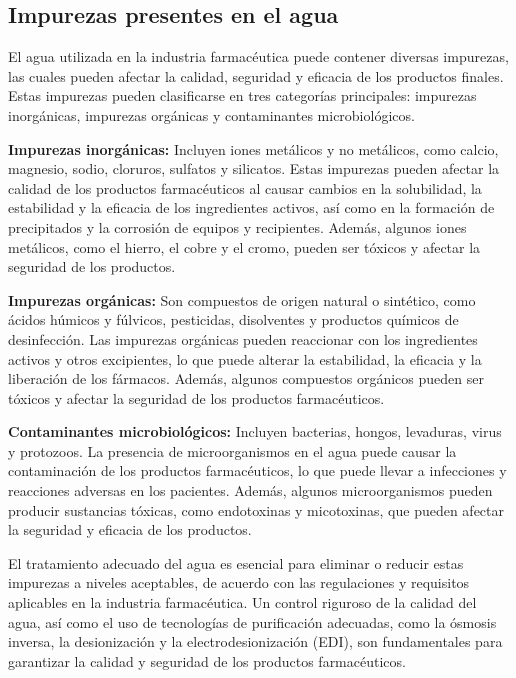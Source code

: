 \subsection{Impurezas presentes en el agua}

El agua utilizada en la industria farmacéutica puede contener diversas impurezas, las cuales pueden afectar la calidad, seguridad y eficacia de los productos finales. Estas impurezas pueden clasificarse en tres categorías principales: impurezas inorgánicas, impurezas orgánicas y contaminantes microbiológicos.

\textbf{Impurezas inorgánicas: }Incluyen iones metálicos y no metálicos, como calcio, magnesio, sodio, cloruros, sulfatos y silicatos. Estas impurezas pueden afectar la calidad de los productos farmacéuticos al causar cambios en la solubilidad, la estabilidad y la eficacia de los ingredientes activos, así como en la formación de precipitados y la corrosión de equipos y recipientes. Además, algunos iones metálicos, como el hierro, el cobre y el cromo, pueden ser tóxicos y afectar la seguridad de los productos.

\textbf{Impurezas orgánicas: }Son compuestos de origen natural o sintético, como ácidos húmicos y fúlvicos, pesticidas, disolventes y productos químicos de desinfección. Las impurezas orgánicas pueden reaccionar con los ingredientes activos y otros excipientes, lo que puede alterar la estabilidad, la eficacia y la liberación de los fármacos. Además, algunos compuestos orgánicos pueden ser tóxicos y afectar la seguridad de los productos farmacéuticos.

\textbf{Contaminantes microbiológicos:} Incluyen bacterias, hongos, levaduras, virus y protozoos. La presencia de microorganismos en el agua puede causar la contaminación de los productos farmacéuticos, lo que puede llevar a infecciones y reacciones adversas en los pacientes. Además, algunos microorganismos pueden producir sustancias tóxicas, como endotoxinas y micotoxinas, que pueden afectar la seguridad y eficacia de los productos.

El tratamiento adecuado del agua es esencial para eliminar o reducir estas impurezas a niveles aceptables, de acuerdo con las regulaciones y requisitos aplicables en la industria farmacéutica. Un control riguroso de la calidad del agua, así como el uso de tecnologías de purificación adecuadas, como la ósmosis inversa, la desionización y la electrodesionización (EDI), son fundamentales para garantizar la calidad y seguridad de los productos farmacéuticos.
